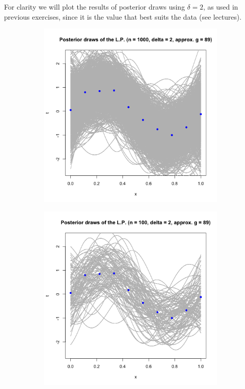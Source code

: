 \documentclass[a4paper, 11pt]{article}
\begin{document}
For clarity we will plot the results of posterior draws using $\delta=2$, as used in previous exercises, since it is the value that best suits the data (see lectures).\\
\begin{figure}
\begin{subfigure}{.5\textwidth}
  \centering
  \includegraphics[width=.8\linewidth]{ps3F_plot2.png}
\end{subfigure}
\begin{subfigure}{.5\textwidth}
  \centering
  \includegraphics[width=.8\linewidth]{ps3F_plot2_0.png}
\end{subfigure}
\end{figure}
\end{document}
